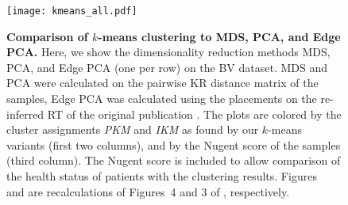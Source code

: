 \begin{figure}[p]
    \centering
    \texttt{[image: kmeans\_all.pdf]}
    \begin{subfigure}{0pt}
        \label{fig:kmeans_all:sub:mds_em}
    \end{subfigure}
    \begin{subfigure}{0pt}
        \label{fig:kmeans_all:sub:mds_ei}
    \end{subfigure}
    \begin{subfigure}{0pt}
        \label{fig:kmeans_all:sub:mds_ns}
    \end{subfigure}
    \begin{subfigure}{0pt}
        \label{fig:kmeans_all:sub:pca_em}
    \end{subfigure}
    \begin{subfigure}{0pt}
        \label{fig:kmeans_all:sub:pca_ei}
    \end{subfigure}
    \begin{subfigure}{0pt}
        \label{fig:kmeans_all:sub:pca_ns}
    \end{subfigure}
    \begin{subfigure}{0pt}
        \label{fig:kmeans_all:sub:epca_em}
    \end{subfigure}
    \begin{subfigure}{0pt}
        \label{fig:kmeans_all:sub:epca_ei}
    \end{subfigure}
    \begin{subfigure}{0pt}
        \label{fig:kmeans_all:sub:epca_ns}
    \end{subfigure}
    \caption[Comparison of $k$-means clustering to MDS, PCA, and Edge PCA]{
        \textbf{Comparison of $k$-means clustering to MDS, PCA, and Edge PCA.}
        Here, we show the dimensionality reduction methods MDS, PCA, and Edge PCA (one per row) on the \ac{BV} dataset.
        MDS and PCA were calculated on the pairwise KR distance matrix of the samples,
        Edge PCA was calculated using the placements on the re-inferred \ac{RT} of the original publication \cite{Srinivasan2012}.
        The plots are colored by the cluster assignments \emph{PKM} and \emph{IKM}
        as found by our $k$-means variants (first two columns), and by the Nugent score of the samples (third column).
        The Nugent score is included to allow comparison of the health status of patients with the clustering results.
        Figures~ and  are recalculations of
        Figures~4 and 3 of \cite{Matsen2011b}, respectively.
    }
    \label{fig:kmeans_all}
\end{figure}


